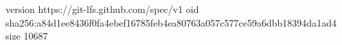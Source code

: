 version https://git-lfs.github.com/spec/v1
oid sha256:a84d1ee8436f0fa4ebef16785feb4ea80763a057c577ce59a6dbb18394da1ad4
size 10687
